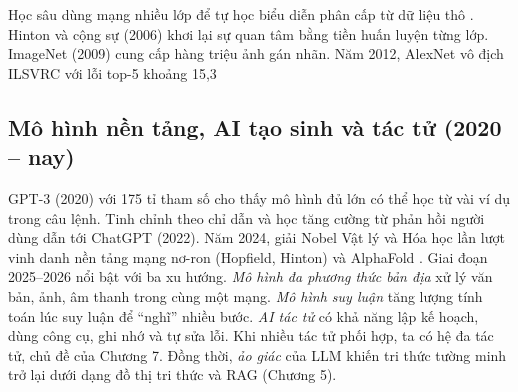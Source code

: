 Học sâu dùng mạng nhiều lớp để tự học biểu diễn phân cấp từ dữ liệu thô \cite{goodfellow2016}. Hinton và cộng sự (2006) \cite{hinton2006} khơi lại sự quan tâm bằng tiền huấn luyện từng lớp. ImageNet (2009) \cite{deng2009} cung cấp hàng triệu ảnh gán nhãn. Năm 2012, AlexNet \cite{krizhevsky2012} vô địch ILSVRC với lỗi top-5 khoảng 15,3%

\subsection{Mô hình nền tảng, AI tạo sinh và tác tử (2020 – nay)}

GPT-3 (2020) \cite{brown2020} với 175 tỉ tham số cho thấy mô hình đủ lớn có thể học từ vài ví dụ trong câu lệnh. Tinh chỉnh theo chỉ dẫn và học tăng cường từ phản hồi người dùng \cite{ouyang2022} dẫn tới ChatGPT (2022). Năm 2024, giải Nobel Vật lý và Hóa học lần lượt vinh danh nền tảng mạng nơ-ron (Hopfield, Hinton) và AlphaFold \cite{jumper2021}. Giai đoạn 2025–2026 nổi bật với ba xu hướng. \emph{Mô hình đa phương thức bản địa} xử lý văn bản, ảnh, âm thanh trong cùng một mạng. \emph{Mô hình suy luận} tăng lượng tính toán lúc suy luận để ``nghĩ'' nhiều bước. \emph{AI tác tử} có khả năng lập kế hoạch, dùng công cụ, ghi nhớ và tự sửa lỗi. Khi nhiều tác tử phối hợp, ta có hệ đa tác tử, chủ đề của Chương 7. Đồng thời, \emph{ảo giác} của LLM khiến tri thức tường minh trở lại dưới dạng đồ thị tri thức và RAG (Chương 5).

